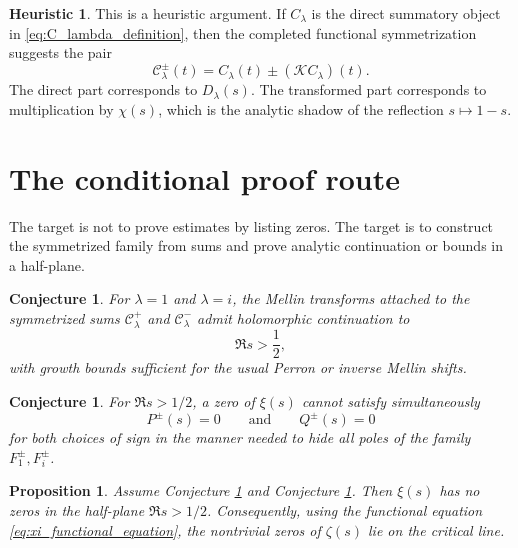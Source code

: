 \documentclass[11pt]{amsart}
\numberwithin{equation}{section}
\theoremstyle{plain}
\newtheorem{proposition}[theorem]{Proposition}
\newtheorem{conjecture}[theorem]{Conjecture}
\theoremstyle{definition}
\newtheorem{heuristic}[theorem]{Heuristic}
\theoremstyle{remark}
\begin{document}
\begin{heuristic}
\label{heur:symmetrized_sum_family}
This is a heuristic argument.  If \(C_\lambda\) is the direct summatory object in \eqref{eq:C_lambda_definition}, then the completed functional symmetrization suggests the pair
\begin{equation}
\mathcal C_\lambda^{\pm}(t)=C_\lambda(t)\pm (\mathcal K C_\lambda)(t).
\label{eq:C_lambda_pm_mellin_sum}
\end{equation}
The direct part corresponds to \(D_\lambda(s)\).  The transformed part corresponds to multiplication by \(\chi(s)\), which is the analytic shadow of the reflection \(s\mapsto 1-s\).
\end{heuristic}

\section{The conditional proof route}
\label{sec:conditional_proof_route}

The target is not to prove estimates by listing zeros.  The target is to construct the symmetrized family from sums and prove analytic continuation or bounds in a half-plane.

\begin{conjecture}
\label{conj:mellin_symmetrized_continuation}
For \(\lambda=1\) and \(\lambda=i\), the Mellin transforms attached to the symmetrized sums \(\mathcal C_\lambda^+\) and \(\mathcal C_\lambda^-\) admit holomorphic continuation to
\begin{equation}
\Re s>\frac12,
\label{eq:target_half_plane}
\end{equation}
with growth bounds sufficient for the usual Perron or inverse Mellin shifts.
\end{conjecture}

\begin{conjecture}
\label{conj:no_simultaneous_numerator_cancellation}
For \(\Re s>1/2\), a zero of \(\xi(s)\) cannot satisfy simultaneously
\begin{equation}
P^{\pm}(s)=0
\qquad\text{and}\qquad
Q^{\pm}(s)=0
\label{eq:no_simultaneous_PQ_cancellation}
\end{equation}
for both choices of sign in the manner needed to hide all poles of the family \(F_1^{\pm},F_i^{\pm}\).
\end{conjecture}

\begin{proposition}
\label{prop:conditional_route_to_RH}
Assume Conjecture \ref{conj:mellin_symmetrized_continuation} and Conjecture \ref{conj:no_simultaneous_numerator_cancellation}.  Then \(\xi(s)\) has no zeros in the half-plane \(\Re s>1/2\).  Consequently, using the functional equation \eqref{eq:xi_functional_equation}, the nontrivial zeros of \(\zeta(s)\) lie on the critical line.
\end{proposition}
\end{document}
